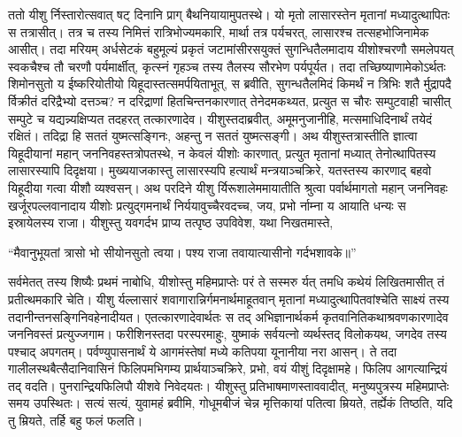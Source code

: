 \adhyAya
{}
\vakya ततो यीशु र्निस्तारोत्सवात् षट् दिनानि प्राग् बैथनियायामुपतस्थे। यो मृतो लासारस्तेन मृतानां मध्यादुत्थापितः स तत्रासीत्।
\vakya तत्र च तस्य निमित्तं रात्रिभोज्यमकारि, मार्था तत्र पर्यचरत्, लासारश्च तत्सहभोजिनामेक आसीत्।
\vakya तदा मरियम् अर्धसेटकं बहुमूल्यं प्रकृतं जटामांसीरसयुक्तं सुगन्धितैलमादाय यीशोश्चरणौ समलेपयत् स्वकचैश्च तौ चरणौ पर्यमार्क्षीत्, कृत्स्नं गृहञ्च तस्य तैलस्य सौरभेण पर्यपूर्यत।
\vakya तदा तच्छिष्याणामेकोऽर्थतः शिमोनसुतो य ईष्करियोतीयो यिहूदास्तत्समर्पयिताभूत्, स ब्रवीति,
\vakya सुगन्धतैलमिदं किमर्थं न त्रिभिः शतै र्मुद्रापदै र्विक्रीतं दरिद्रैभ्यो दत्तञ्च?
\vakya न दरिद्राणां हितचिन्तनकारणात् तेनेदमकथ्यत, प्रत्युत स चौरः सम्पुटवाही चासीत् सम्पुटे च यद्यन्न्यक्षिप्यत तदहरत् तत्कारणादेव।
\vakya यीशुस्तदाब्रवीत्, अमूमनुजानीहि, मत्समाधिदिनार्थं तयेदं रक्षितं।
\vakya तदिद्रा हि सततं युष्मत्सङ्गिनः, अहन्तु न सततं युष्मत्सङ्गी।
\vakya अथ यीशुस्तत्रास्तीति ज्ञात्वा यिहूदीयानां महान् जननिवहस्तत्रोपतस्थे, न केवलं यीशोः कारणात्, प्रत्युत मृतानां मध्यात् तेनोत्थापितस्य लासारस्यापि दिदृक्षया।
\vakya मुख्ययाजकास्तु लासारस्यपि हत्यार्थं मन्त्रयाञ्चक्रिरे,
\vakya यतस्तस्य कारणाद् बहवो यिहूदीया गत्वा यीशौ व्यश्वसन्।
\vakya अथ परदिने यीशु र्यिरूशालेममायातीति श्रुत्वा पर्वार्थमागतो महान् जननिवहः
\vakya खर्जूरपल्लवानादाय यीशोः प्रत्युद्गमनार्थं निर्ययावुच्चैरवदच्च, जय, प्रभो र्नाम्ना य आयाति धन्यः स इस्रायेलस्य राजा।
\vakya यीशुस्तु यवगर्दभ प्राप्य तत्पृष्ठ उपविवेश, यथा निखतमास्ते,
\begin{poem}
\startwithvakya “मैवानुभूयतां त्रासो भो सीयोनसुतो त्वया।
\pline पश्य राजा तवायात्यासीनो गर्दभशावके॥”
\end{poem}
\vakya सर्वमेतत् तस्य शिष्यैः प्रथमं नाबोधि, यीशोस्तु महिमप्राप्तेः परं ते सस्मरु र्यत् तमधि कथेयं लिखितमासीत् तं प्रतीत्थमकारि चेति।
\vakya यीशु र्यल्लासारं शवागारान्निर्गमनार्थमाहूतवान् मृतानां मध्यादुत्थापितवांश्चेति साक्ष्यं तस्य तदानीन्तनसङ्गिनिवहेनादीयत।
\vakya एतत्कारणादेवार्थतः स तद् अभिज्ञानार्थकर्म कृतवानितिकथाश्रवणकारणादेव जननिवस्तं प्रत्युज्जगाम।
\vakya फरीशिनस्तदा परस्परमाहुः, युष्माकं सर्वयत्नो व्यर्थस्तद् विलोकयथ, जगदेव तस्य पश्चाद् अपगतम्।
\vakya पर्वण्युपासनार्थं ये आगमंस्तेषां मध्ये कतिपया यूनानीया नरा आसन्।
\vakya ते तदा गालीलस्थबैत्सैदानिवासिनं फिलिपमभिगम्य प्रार्थयाञ्चक्रिरे, प्रभो, वयं यीशुं दिदृक्षामहे।
\vakya फिलिप आगत्यान्द्रियं तद् वदति। पुनरान्द्रियफिलिपौ यीशवे निवेदयतः।
\vakya यीशुस्तु प्रतिभाषमाणस्ताववादीत्, मनुष्यपुत्रस्य महिमप्राप्तेः समय उपस्थितः।
\vakya सत्यं सत्यं, युवामहं ब्रवीमि, गोधूमबीजं चेन्न मृत्तिकायां पतित्वा म्रियते, तर्ह्येकं तिष्ठति, यदि तु म्रियते, तर्हि बहु फलं फलति।
